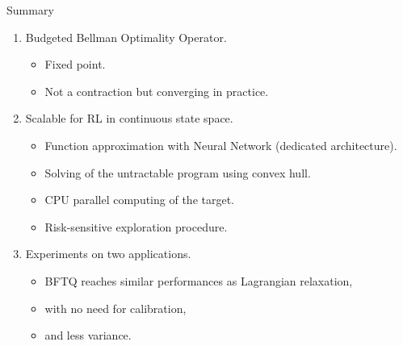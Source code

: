 \documentclass{beamer}
\begin{document}


    \begin{frame}{Summary}

        \begin{enumerate}[+]
            \pause\item<1-> Budgeted Bellman Optimality Operator.
            \begin{itemize}
                \pause\item Fixed point.
                \pause\item Not a contraction but converging in practice.
            \end{itemize}
            \pause\item<2-> Scalable for RL in continuous state space.
            \begin{itemize}
                \pause\item Function approximation with Neural Network (dedicated architecture).
                \pause\item Solving of the untractable program using convex hull.
                \pause\item CPU parallel computing of the target.
                \pause\item Risk-sensitive exploration procedure.
            \end{itemize}

            \pause\item<3-> Experiments on two applications.
            \begin{itemize}
                \pause\item BFTQ reaches similar performances as Lagrangian relaxation,
                \pause\item with no need for calibration,
                \pause\item and less variance.
            \end{itemize}
        \end{enumerate}

    \end{frame}
\end{document}

